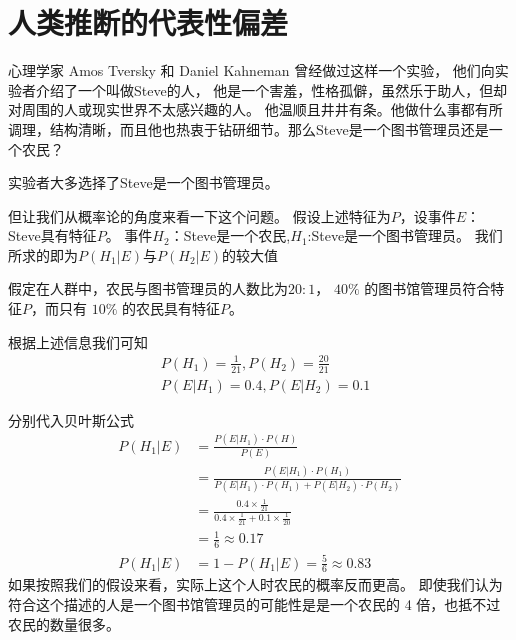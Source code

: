 \documentclass[a4paper,AutoFakeBold,oneside,12pt,fontset=windows]{book}
\begin{document}
\blankmatter
  

%   

%   

%  

\frontmatter\tableofcontents %


\newpage\mainmatter
{}


\section{人类推断的代表性偏差}

心理学家 Amos Tversky 和 Daniel Kahneman 曾经做过这样一个实验，
他们向实验者介绍了一个叫做Steve的人，\cite{false_news_spread_2018}
他是一个害羞，性格孤僻，虽然乐于助人，但却对周围的人或现实世界不太感兴趣的人。
他温顺且井井有条。他做什么事都有所调理，结构清晰，而且他也热衷于钻研细节。那么Steve是一个图书管理员还是一个农民？
\par
实验者大多选择了Steve是一个图书管理员。
\par

但让我们从概率论的角度来看一下这个问题。
假设上述特征为$P$，设事件$E$：Steve具有特征$P$。
事件$H_2$：Steve是一个农民,$H_1$:Steve是一个图书管理员。
我们所求的即为$P(H_1|E)$与$P(H_2|E)$的较大值

假定在人群中，农民与图书管理员的人数比为$20:1$，
$40\%$ 的图书馆管理员符合特征$P$，而只有 $10\%$ 的农民具有特征$P$。

根据上述信息我们可知
\begin{align*}
	&P(H_1)=\frac{1}{21},P(H_2)=\frac{20}{21} \\
	&P(E|H_1)=0.4,P(E|H_2)=0.1
\end{align*}

分别代入贝叶斯公式
\begin{align*}
	P(H_1|E)&=\frac{P(E|H_1)\cdot P(H)}{P(E)}\\
		&=\frac{P(E|H_1)\cdot P(H_1)}{P(E|H_1)\cdot P(H_1)+P(E|H_2)\cdot P(H_2)}\\
		&=\frac{0.4\times\frac{1}{21}}{0.4\times\frac{1}{21} +0.1\times\frac{1}{20}}\\
		&=\frac{1}{6}\approx{0.17}\\
	P(H_1|E)&=1-P(H_1|E)=\frac{5}{6}\approx{0.83}
\end{align*}
如果按照我们的假设来看，实际上这个人时农民的概率反而更高。
即使我们认为符合这个描述的人是一个图书馆管理员的可能性是是一个农民的 4 倍，也抵不过农民的数量很多。
\end{document}
